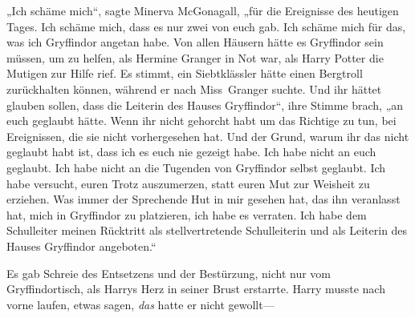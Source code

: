 „Ich schäme mich“, sagte Minerva McGonagall, „für die Ereignisse des heutigen Tages. Ich schäme mich, dass es nur zwei von euch gab. Ich schäme mich für das, was ich Gryffindor angetan habe. Von allen Häusern hätte es Gryffindor sein müssen, um zu helfen, als Hermine Granger in Not war, als Harry Potter die Mutigen zur Hilfe rief. Es stimmt, ein Siebtklässler hätte einen Bergtroll zurückhalten können, während er nach Miss~Granger suchte. Und ihr hättet glauben sollen, dass die Leiterin des Hauses Gryffindor“, ihre Stimme brach, „an euch geglaubt hätte. Wenn ihr nicht gehorcht habt um das Richtige zu tun, bei Ereignissen, die sie nicht vorhergesehen hat. Und der Grund, warum ihr das nicht geglaubt habt ist, dass ich es euch nie gezeigt habe. Ich habe nicht an euch geglaubt. Ich habe nicht an die Tugenden von Gryffindor selbst geglaubt. Ich habe versucht, euren Trotz auszumerzen, statt euren Mut zur Weisheit zu erziehen. Was immer der Sprechende Hut in mir gesehen hat, das ihn veranlasst hat, mich in Gryffindor zu platzieren, ich habe es verraten. Ich habe dem Schulleiter meinen Rücktritt als stellvertretende Schulleiterin und als Leiterin des Hauses Gryffindor angeboten.“

\later

Es gab Schreie des Entsetzens und der Bestürzung, nicht nur vom Gryffindortisch, als Harrys Herz in seiner Brust erstarrte. Harry musste nach vorne laufen, etwas sagen, \emph{das} hatte er nicht gewollt—

